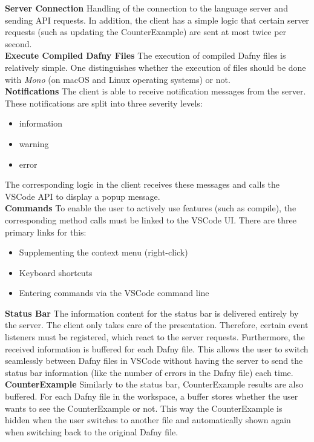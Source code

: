 {\bf Server Connection} \textendash{}
Handling of the connection to the language server and sending API requests.
In addition, the client has a simple logic that certain server requests (such as updating the CounterExample)
are sent at most twice per second. \\

{\bf Execute Compiled Dafny Files} \textendash{}
The execution of compiled Dafny files is relatively simple.
One distinguishes whether the execution of  files should be done with \textit{Mono} (on macOS and Linux operating systems) or not. \\

{\bf Notifications} \textendash{}
The client is able to receive notification messages from the server.
These notifications are split into three severity levels:
\begin{itemize}
    \item information
    \item warning
    \item error
\end{itemize}
The corresponding logic in the client receives these messages and calls the VSCode API to display a popup message. \\

{\bf Commands} \textendash{}
To enable the user to actively use features (such as compile),
the corresponding method calls must be linked to the VSCode UI.
There are three primary links for this:
\begin{itemize}
    \item Supplementing the context menu (right-click)
    \item Keyboard shortcuts
    \item Entering commands via the VSCode command line
\end{itemize}

{\bf Status Bar} \textendash{}
The information content for the status bar is delivered entirely by the server.
The client only takes care of the presentation.
Therefore, certain event listeners must be registered, which react to the server requests.
Furthermore, the received information is buffered for each Dafny file.
This allows the user to switch seamlessly between Dafny files in VSCode
without having the server to send the status bar information
(like the number of errors in the Dafny file) each time.\\

{\bf CounterExample} \textendash{}
Similarly to the status bar, CounterExample results are also buffered.
For each Dafny file in the workspace, a buffer stores whether the user wants to see the CounterExample or not.
This way the CounterExample is hidden when the user switches to another file
and automatically shown again when switching back to the original Dafny file.

